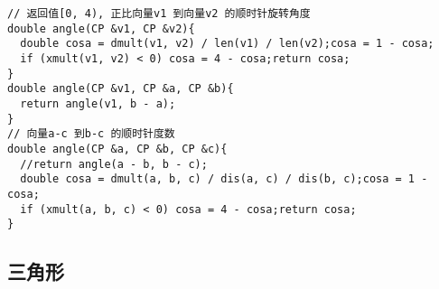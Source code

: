 \begin{lstlisting}[language={}]
// 返回值[0, 4), 正比向量v1 到向量v2 的顺时针旋转角度 
double angle(CP &v1, CP &v2){
  double cosa = dmult(v1, v2) / len(v1) / len(v2);cosa = 1 - cosa;
  if (xmult(v1, v2) < 0) cosa = 4 - cosa;return cosa;
}
double angle(CP &v1, CP &a, CP &b){
  return angle(v1, b - a);
}
// 向量a-c 到b-c 的顺时针度数 
double angle(CP &a, CP &b, CP &c){
  //return angle(a - b, b - c);
  double cosa = dmult(a, b, c) / dis(a, c) / dis(b, c);cosa = 1 - cosa;
  if (xmult(a, b, c) < 0) cosa = 4 - cosa;return cosa;
}
\end{lstlisting}
\subsection{三角形}
